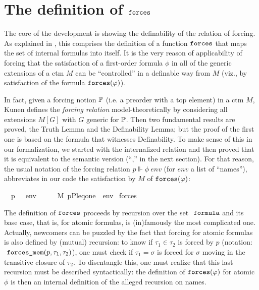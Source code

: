 \section{The definition of $\mathop{\mathtt{forces}}$}
\label{sec:definition-forces}

The core of the development is showing the definability of the
relation of forcing. As explained in
\cite[Sect.~8]{2019arXiv190103313G}, this comprises the 
definition of a function $\mathop{\mathtt{forces}}$ that maps the set of internal
formulas into itself. It is the very reason of applicability of
forcing that the satisfaction of a first-order formula  $\phi$ in all of the generic
extensions of a ctm $M$ can be ``controlled'' in a definable way from
$M$ (viz., by  satisfaction of the formula $\mathop{\mathtt{forces}}(\varphi)$). 

In fact, given a forcing notion $\mathbb{P}$ (i.e. a preorder with a top element)
in a ctm $M$,
Kunen defines the \emph{forcing relation} model-theoretically 
by considering all extensions $M[G]$ with $G$ generic for $\mathbb{P}$.
Then two fundamental results are proved, the Truth Lemma and the
Definability Lemma; but the proof of the first one is based on the
formula that witnesses Definability. To make sense of this in our 
formalization, we started with the internalized relation and then
proved that it is equivalent to the semantic version 
(``,'' in
the next section).
For that reason, the usual notation of the forcing relation 
$p \Vdash \phi\ \mathit{env}$ (for $\mathit{env}$ a list of
``names''), abbreviates in our code the
satisfaction by $M$ of $\mathop{\mathtt{forces}}(\varphi)$:
\begin{isabelle}
\ \ {\isachardoublequoteopen}p\ {\isasymtturnstile}\ {\isasymphi}\ env\ \ \ {\isasymequiv}\ \ \ M{\isacharcomma}\ {\isacharparenleft}{\isacharbrackleft}p{\isacharcomma}P{\isacharcomma}leq{\isacharcomma}one{\isacharbrackright}\ {\isacharat}\ env{\isacharparenright}
    {\isasymTurnstile}\ forces{\isacharparenleft}{\isasymphi}{\isacharparenright}{\isachardoublequoteclose}
\end{isabelle}

The definition of $\mathop{\mathtt{forces}}$ proceeds by recursion
over the set $\formula$ and its base case, that is, for
atomic formulas, is (in)famously the most complicated one. Actually,
newcomers can be puzzled by the fact that forcing for atomic
formulas is also defined by (mutual) recursion: to know if $\tau_1\in\tau_2$ is
forced by $p$ (notation: $\forcesmem(p,\tau_1,\tau_2)$), one must check if $\tau_1=\sigma$ is forced for $\sigma$
moving in the transitive closure of $\tau_2$. To disentangle this, one
must realize that this last recursion must be described syntactically:
the definition of $\mathop{\mathtt{forces}}(\varphi)$ for atomic $\phi$ is then an
internal definition of the alleged recursion on names. 

